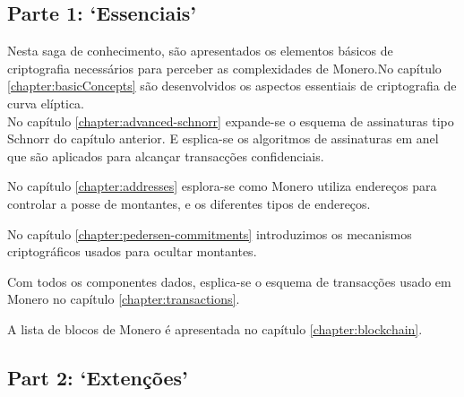 

\subsection{Parte 1: `Essenciais'}

Nesta saga de conhecimento, são apresentados os elementos básicos de criptografia necessários para perceber as complexidades de Monero.\newline No capítulo \ref{chapter:basicConcepts} são desenvolvidos os aspectos essentiais de criptografia de curva elíptica.  
\\
No capítulo \ref{chapter:advanced-schnorr} expande-se o esquema de assinaturas tipo Schnorr do capítulo anterior. E esplica-se os algoritmos de assinaturas em anel que são aplicados para alcançar transacções confidenciais.

No capítulo \ref{chapter:addresses} esplora-se como Monero utiliza endereços para controlar a posse de montantes, e os diferentes tipos de endereços.

No capítulo \ref{chapter:pedersen-commitments} introduzimos os mecanismos criptográficos usados para ocultar montantes. 

Com todos os componentes dados, esplica-se o esquema de transacções usado em Monero no capítulo \ref{chapter:transactions}.

A lista de blocos de Monero é apresentada no capítulo \ref{chapter:blockchain}.


\subsection{Part 2: `Extenções'}

